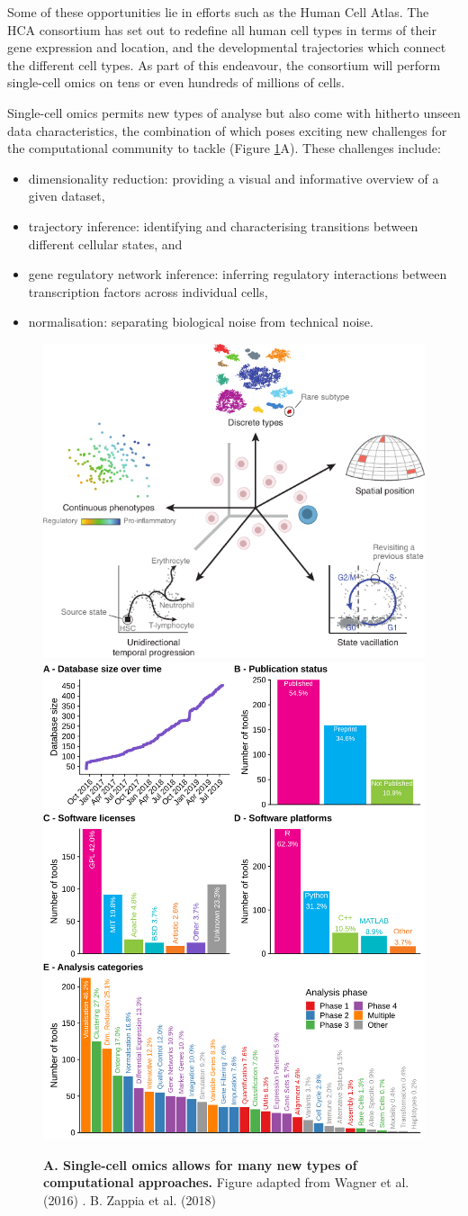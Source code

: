 Some of these opportunities lie in efforts such as the Human Cell Atlas. The HCA consortium has set out to redefine all human cell types in terms of their gene expression and location, and the developmental trajectories which connect the different cell types. As part of this endeavour, the consortium will perform single-cell omics on tens or even hundreds of millions of cells.

Single-cell omics permits new types of analyse but also come with hitherto unseen data characteristics, the combination of which poses exciting new challenges for the computational community to tackle  (Figure \ref{fig:comp_tools}A)\cite{stegle_computationalanalyticalchallenges_2015,yuan_challengesemergingdirections_2017,chen_singlecellrnaseqtechnologies_2019}. These challenges include:
\begin{itemize}
	\item dimensionality reduction: providing a visual and informative overview of a given dataset, 
	\item trajectory inference: identifying and characterising transitions between different cellular states, and
	\item gene regulatory network inference: inferring regulatory interactions between transcription factors across individual cells,
	\item normalisation: separating biological noise from technical noise.
\end{itemize}

\begin{figure}
	\centering\includegraphics[width=.5\linewidth]{fig/introduction/singlecell_tools}
	\centering\includegraphics[width=.3\linewidth]{fig/introduction/scrnatools}
	\caption{\textbf{A. Single-cell omics allows for many new types of computational approaches.} Figure adapted from Wagner et al. (2016) \cite{wagner_revealingvectorscellular_2016}.
		B. Zappia et al. (2018) \cite{zappia_exploringsinglecellrnaseq_2018}
	}
	\label{fig:comp_tools}
\end{figure}

